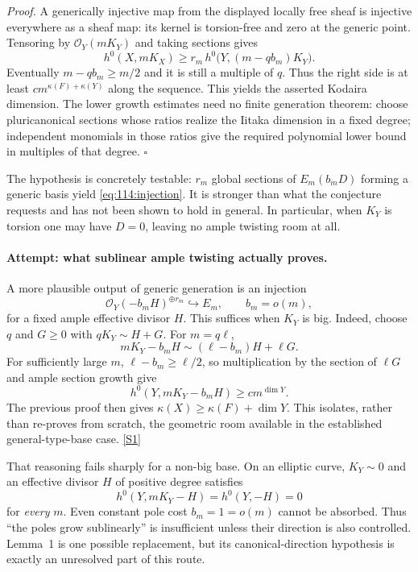 \documentclass[11pt,a4paper]{article}
\newcommand{\sref}[2]{\hyperlink{source:#1:#2}{[S#2]}}
\numberwithin{equation}{section}
\begin{document}
\emph{Proof.} A generically injective map from the displayed locally free
sheaf is injective everywhere as a sheaf map: its kernel is torsion-free
and zero at the generic point. Tensoring by $\mathcal O_Y(mK_Y)$ and taking
sections gives
\[
 h^0(X,mK_X)\geq r_m\,
 h^0\bigl(Y,(m-qb_m)K_Y\bigr).
\]
Eventually $m-qb_m\geq m/2$ and it is still a multiple of $q$. Thus the
right side is at least $c m^{\kappa(F)+\kappa(Y)}$ along the sequence.
This yields the asserted Kodaira dimension. The lower growth estimates
need no finite generation theorem: choose pluricanonical sections whose
ratios realize the Iitaka dimension in a fixed degree; independent
monomials in those ratios give the required polynomial lower bound in
multiples of that degree. $\square$

The hypothesis is concretely testable: $r_m$ global sections of
$E_m(b_mD)$ forming a generic basis yield \eqref{eq:114:injection}.
It is stronger than what the conjecture requests and has not been shown
to hold in general. In particular, when $K_Y$ is torsion one may have
$D=0$, leaving no ample twisting room at all.

\paragraph{Attempt: what sublinear ample twisting actually proves.}
A more plausible output of generic generation is an injection
\[
 \mathcal O_Y(-b_mH)^{\oplus r_m}\hookrightarrow E_m,
 \qquad b_m=o(m),
\]
for a fixed ample effective divisor $H$. This suffices when $K_Y$ is big.
Indeed, choose $q$ and $G\geq0$ with $qK_Y\sim H+G$. For $m=q\ell$,
\[
 mK_Y-b_mH\sim(\ell-b_m)H+\ell G.
\]
For sufficiently large $m$, $\ell-b_m\geq\ell/2$, so multiplication by
the section of $\ell G$ and ample section growth give
\[
 h^0(Y,mK_Y-b_mH)\geq c m^{\dim Y}.
\]
The previous proof then gives $\kappa(X)\geq\kappa(F)+\dim Y$.
This isolates, rather than re-proves from scratch, the geometric room
available in the established general-type-base case. \sref{114}{1}

That reasoning fails sharply for a non-big base. On an elliptic curve,
$K_Y\sim0$ and an effective divisor $H$ of positive degree satisfies
\[
 h^0(Y,mK_Y-H)=h^0(Y,-H)=0
\]
for \emph{every} $m$. Even constant pole cost $b_m=1=o(m)$ cannot be
absorbed. Thus ``the poles grow sublinearly'' is insufficient unless
their direction is also controlled. Lemma~1 is one possible replacement,
but its canonical-direction hypothesis is exactly an unresolved part
of this route.
\end{document}
